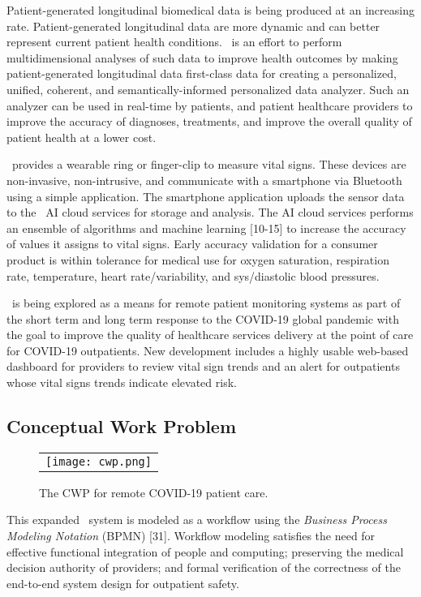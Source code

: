 Patient-generated longitudinal biomedical data is being produced at an increasing rate. Patient-generated longitudinal data are more dynamic and can better represent current patient health conditions. \phware\ is an effort to perform multidimensional analyses of such data to improve health outcomes by making patient-generated longitudinal data first-class data for creating a personalized, unified, coherent, and semantically-informed personalized data analyzer. Such an analyzer can be used in real-time by patients, and patient healthcare providers to improve the accuracy of diagnoses, treatments, and improve the overall quality of patient health at a lower cost.

\phware\ provides a wearable ring or finger-clip to measure vital signs. These devices are non-invasive, non-intrusive, and  communicate with a smartphone via Bluetooth using a simple application. The smartphone application uploads the sensor data to the \phware\ AI cloud services for storage and analysis. The AI cloud services performs an ensemble of algorithms and machine learning [10-15] to increase the accuracy of values it assigns to vital signs. Early accuracy validation for a consumer product is within tolerance for medical use for oxygen saturation, respiration rate, temperature, heart rate/variability, and sys/diastolic blood pressures.

\phware\ is being explored as a means for remote patient monitoring systems as part of the short term and long term response to the COVID-19 global pandemic with the goal to improve the quality of healthcare services delivery at the point of care for COVID-19 outpatients. New development includes a highly usable web-based dashboard for providers to review vital sign trends and an alert for outpatients whose vital signs trends indicate elevated risk.

\subsection{Conceptual Work Problem}
\begin{figure*}
  \begin{center}
    \begin{tabular}{c}
      \texttt{[image: cwp.png]}
    \end{tabular}
  \end{center}
\caption{The CWP for remote COVID-19 patient care.}
\label{fig:cwp}
\end{figure*}

This expanded \phware\ system is modeled as a workflow using the \emph{Business Process Modeling Notation} (BPMN) [31]. Workflow modeling satisfies the need for effective functional integration of people and computing; preserving the medical decision authority of providers; and formal verification of the correctness of the end-to-end system design for outpatient safety.

